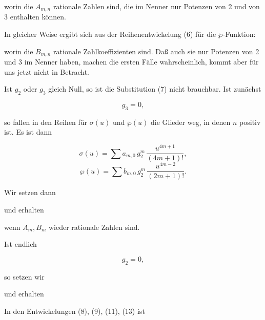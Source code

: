 
worin die $A_{m,n}$ rationale Zahlen sind, die im Nenner nur Potenzen
von 2 und von 3 enthalten k\"onnen.

In gleicher Weise ergibt sich aus der Reihenentwickelung (6) f\"ur
die $\wp$-Funktion:


worin die $B_{m,n}$ rationale Zahlkoeffizienten sind. Da\ss{} auch sie
nur Potenzen von 2 und 3 im Nenner haben, machen die ersten F\"alle
wahrscheinlich, kommt aber f\"ur uns jetzt nicht in Betracht.

Ist $g_2$ oder $g_3$ gleich Null, so ist die Substitution (7) nicht
brauchbar. Ist zun\"achst

\[
g_3 = 0,
\]

so fallen in den Reihen f\"ur $\sigma(u)$ und $\wp(u)$ die Glieder
weg, in denen $n$ positiv ist. Es ist dann

\[
\sigma(u) = \sum a_{m,0}\, g_2^m\, \frac{u^{4m+1}}{(4m+1)!},
\]
\[
\wp(u) = \sum b_{m,0}\, g_2^m\, \frac{u^{4m-2}}{(2m+1)!}.
\]

Wir setzen dann


und erhalten


wenn $A_m, B_m$ wieder rationale Zahlen sind.

Ist endlich

\[
g_2 = 0,
\]

so setzen wir


und erhalten


In den Entwickelungen (8), (9), (11), (13) ist


